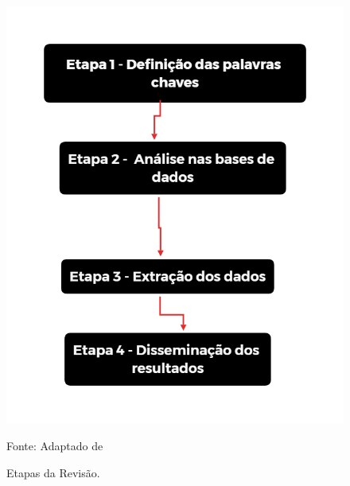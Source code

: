 \begin{figure}[H]
	\centering
	\caption{Etapas da Revisão.}
	\label{fig:rsl}
	\includegraphics[width=0.5\linewidth]{Revisao/Figuras/RSL}
	
	Fonte: Adaptado de 
\end{figure}
